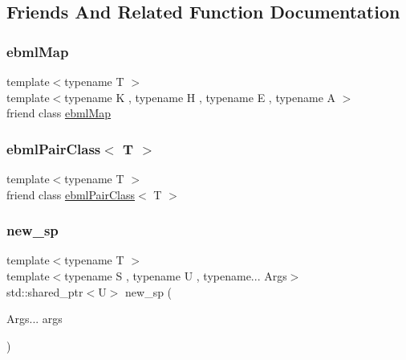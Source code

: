 \subsection{Friends And Related Function Documentation}
\mbox{\label{classebml_1_1ebmlPair_a5e601ae5dd2ba30dd0cb454b0fa1669b}} 
\subsubsection{\texorpdfstring{ebml\+Map}{ebmlMap}}
{\footnotesize\ttfamily template$<$typename T $>$ \\
template$<$typename K , typename H , typename E , typename A $>$ \\
friend class \mbox{\hyperlink{classebml_1_1ebmlMap}{ebml\+Map}}\hspace{0.3cm}{\ttfamily [friend]}}

\mbox{\label{classebml_1_1ebmlPair_a5e73cd835193fd285beab865e019a429}} 
\subsubsection{\texorpdfstring{ebml\+Pair\+Class$<$ T $>$}{ebmlPairClass< T >}}
{\footnotesize\ttfamily template$<$typename T $>$ \\
friend class \mbox{\hyperlink{classebml_1_1ebmlPairClass}{ebml\+Pair\+Class}}$<$ T $>$\hspace{0.3cm}{\ttfamily [friend]}}

\mbox{\label{classebml_1_1ebmlPair_ace404b6adc012cac5ccd9c03160456e3}} 
\subsubsection{\texorpdfstring{new\+\_\+sp}{new\_sp}}
{\footnotesize\ttfamily template$<$typename T $>$ \\
template$<$typename S , typename U , typename... Args$>$ \\
std\+::shared\+\_\+ptr$<$U$>$ new\+\_\+sp (\begin{DoxyParamCaption}\item[{Args...}]{args }\end{DoxyParamCaption})\hspace{0.3cm}{\ttfamily [friend]}}



